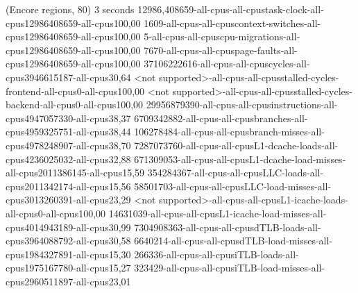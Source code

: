 (Encore regions, 80)
3 seconds
12986,408659-all-cpus-all-cpustask-clock-all-cpus12986408659-all-cpus100,00
1609-all-cpus-all-cpuscontext-switches-all-cpus12986408659-all-cpus100,00
5-all-cpus-all-cpuscpu-migrations-all-cpus12986408659-all-cpus100,00
7670-all-cpus-all-cpuspage-faults-all-cpus12986408659-all-cpus100,00
37106222616-all-cpus-all-cpuscycles-all-cpus3946615187-all-cpus30,64
<not supported>-all-cpus-all-cpusstalled-cycles-frontend-all-cpus0-all-cpus100,00
<not supported>-all-cpus-all-cpusstalled-cycles-backend-all-cpus0-all-cpus100,00
29956879390-all-cpus-all-cpusinstructions-all-cpus4947057330-all-cpus38,37
6709342882-all-cpus-all-cpusbranches-all-cpus4959325751-all-cpus38,44
106278484-all-cpus-all-cpusbranch-misses-all-cpus4978248907-all-cpus38,70
7287073760-all-cpus-all-cpusL1-dcache-loads-all-cpus4236025032-all-cpus32,88
671309053-all-cpus-all-cpusL1-dcache-load-misses-all-cpus2011386145-all-cpus15,59
354284367-all-cpus-all-cpusLLC-loads-all-cpus2011342174-all-cpus15,56
58501703-all-cpus-all-cpusLLC-load-misses-all-cpus3013260391-all-cpus23,29
<not supported>-all-cpus-all-cpusL1-icache-loads-all-cpus0-all-cpus100,00
14631039-all-cpus-all-cpusL1-icache-load-misses-all-cpus4014943189-all-cpus30,99
7304908363-all-cpus-all-cpusdTLB-loads-all-cpus3964088792-all-cpus30,58
6640214-all-cpus-all-cpusdTLB-load-misses-all-cpus1984327891-all-cpus15,30
266336-all-cpus-all-cpusiTLB-loads-all-cpus1975167780-all-cpus15,27
323429-all-cpus-all-cpusiTLB-load-misses-all-cpus2960511897-all-cpus23,01
